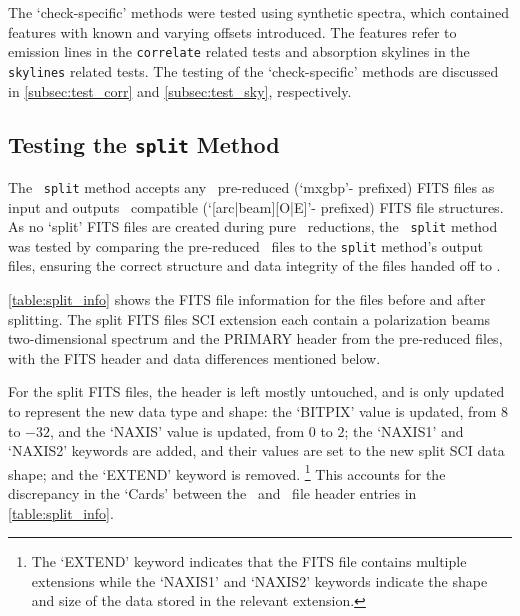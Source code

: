 The `check-specific' methods were tested using synthetic spectra, which contained features with known and varying offsets introduced.
The features refer to emission lines in the \texttt{correlate} related tests and absorption skylines in the \texttt{skylines} related tests.
The testing of the `check-specific' methods are discussed in \autoref{subsec:test_corr} and \autoref{subsec:test_sky}, respectively.

\subsection{Testing the \texttt{split} Method} \label{subsec:test_split}

The \stops\ \texttt{split} method accepts any \polsalt\ pre-reduced (`mxgbp'- prefixed) \gls{FITS} files as input and outputs \iraf\ compatible (`[arc|beam][O|E]'- prefixed) \gls{FITS} file structures.
As no `split' \gls{FITS} files are created during pure \polsalt\ reductions, the \stops\ \texttt{split} method was tested by comparing the pre-reduced \polsalt\ files to the \texttt{split} method's output files, ensuring the correct structure and data integrity of the files handed off to \iraf.



\autoref{table:split_info} shows the \gls{FITS} file information for the files before and after splitting.
The split \gls{FITS} files \gls{SCI} extension each contain a polarization beams two-dimensional spectrum and the \gls{PRIMARY} header from the pre-reduced files, with the \gls{FITS} header and data differences mentioned below.

For the split \gls{FITS} files, the header is left mostly untouched, and is only updated to represent the new data type and shape:
the `BITPIX' value is updated, from $8$ to $-32$, and the `NAXIS' value is updated, from $0$ to $2$;
the `NAXIS1' and `NAXIS2' keywords are added, and their values are set to the new split \gls{SCI} data shape;
and the `EXTEND' keyword is removed.%
\footnote{The `EXTEND' keyword indicates that the \gls{FITS} file contains multiple extensions while the `NAXIS1' and `NAXIS2' keywords indicate the shape and size of the data stored in the relevant extension.}
This accounts for the discrepancy in the `Cards' between the \polsalt\ and \stops\ file header entries in \autoref{table:split_info}.

